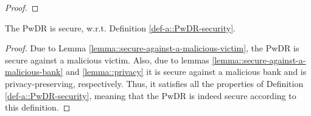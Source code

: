 \begin{proof}
%
\end{proof}

\vspace{-3mm}
\begin{theorem}
The PwDR is secure, w.r.t.  Definition \ref{def-a::PwDR-security}.
\end{theorem}


\vspace{-3mm}
\begin{proof}
Due to Lemma \ref{lemma::secure-against-a-malicious-victim}, the PwDR is secure against a malicious victim. Also, due to lemmas \ref{lemma::secure-against-a-malicious-bank} and \ref{lemma::privacy} it is  secure against a malicious bank and is privacy-preserving, respectively. Thus, it satisfies all the properties of Definition \ref{def-a::PwDR-security}, meaning that the PwDR is indeed secure according to this definition. 
\end{proof}



